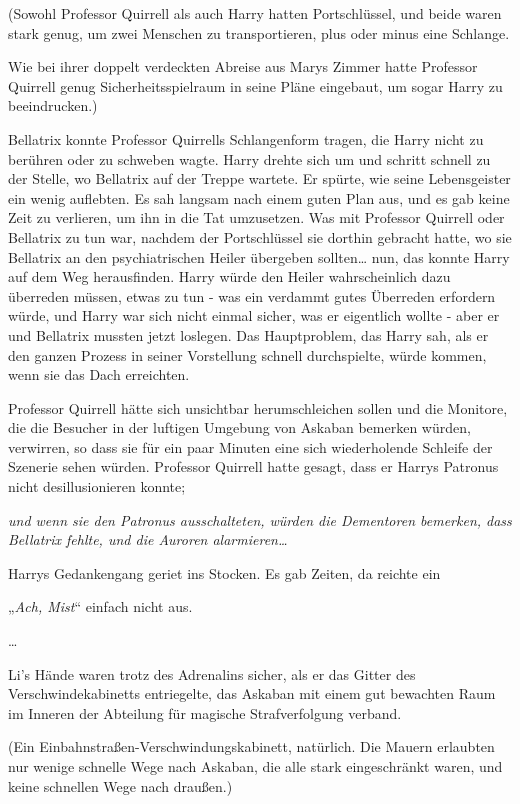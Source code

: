 {(Sowohl Professor Quirrell als auch Harry hatten Portschlüssel, und beide waren stark genug, um zwei Menschen zu transportieren, plus oder minus eine Schlange.

Wie bei ihrer doppelt verdeckten Abreise aus Marys Zimmer hatte Professor Quirrell genug Sicherheitsspielraum in seine Pläne eingebaut, um sogar Harry zu beeindrucken.)

Bellatrix konnte Professor Quirrells Schlangenform tragen, die Harry nicht zu berühren oder zu schweben wagte. Harry drehte sich um und schritt schnell zu der Stelle, wo Bellatrix auf der Treppe wartete. Er spürte, wie seine Lebensgeister ein wenig auflebten. Es sah langsam nach einem guten Plan aus, und es gab keine Zeit zu verlieren, um ihn in die Tat umzusetzen. Was mit Professor Quirrell oder Bellatrix zu tun war, nachdem der Portschlüssel sie dorthin gebracht hatte, wo sie Bellatrix an den psychiatrischen Heiler übergeben sollten… nun, das konnte Harry auf dem Weg herausfinden. Harry würde den Heiler wahrscheinlich dazu überreden müssen, etwas zu tun - was ein verdammt gutes Überreden erfordern würde, und Harry war sich nicht einmal sicher, was er eigentlich wollte - aber er und Bellatrix mussten jetzt loslegen. Das Hauptproblem, das Harry sah, als er den ganzen Prozess in seiner Vorstellung schnell durchspielte, würde kommen, wenn sie das Dach erreichten.

Professor Quirrell hätte sich unsichtbar herumschleichen sollen und die Monitore, die die Besucher in der luftigen Umgebung von Askaban bemerken würden, verwirren, so dass sie für ein paar Minuten eine sich wiederholende Schleife der Szenerie sehen würden. Professor Quirrell hatte gesagt, dass er Harrys Patronus nicht desillusionieren konnte;

\emph{und wenn sie den Patronus ausschalteten, würden die Dementoren bemerken, dass Bellatrix fehlte, und die Auroren alarmieren…}

Harrys Gedankengang geriet ins Stocken. Es gab Zeiten, da reichte ein

„\emph{Ach, Mist}“ einfach nicht aus.

…

Li's Hände waren trotz des Adrenalins sicher, als er das Gitter des Verschwindekabinetts entriegelte, das Askaban mit einem gut bewachten Raum im Inneren der Abteilung für magische Strafverfolgung verband.

(Ein Einbahnstraßen-Verschwindungskabinett, natürlich. Die Mauern erlaubten nur wenige schnelle Wege nach Askaban, die alle stark eingeschränkt waren, und keine schnellen Wege nach draußen.)

}

